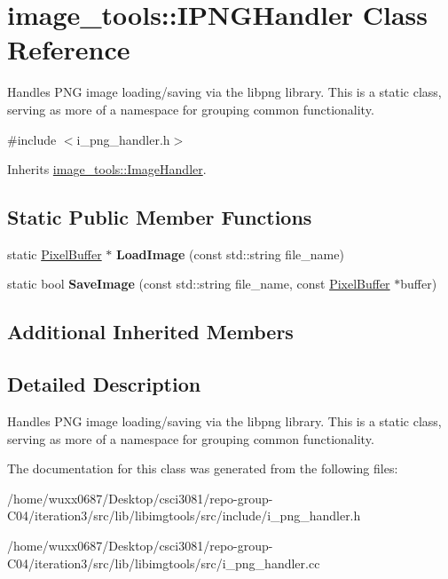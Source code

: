 \hypertarget{classimage__tools_1_1IPNGHandler}{}\section{image\+\_\+tools\+:\+:I\+P\+N\+G\+Handler Class Reference}
\label{classimage__tools_1_1IPNGHandler}


Handles P\+NG image loading/saving via the libpng library. This is a static class, serving as more of a namespace for grouping common functionality.  




{\ttfamily \#include $<$i\+\_\+png\+\_\+handler.\+h$>$}



Inherits \hyperlink{classimage__tools_1_1ImageHandler}{image\+\_\+tools\+::\+Image\+Handler}.

\subsection*{Static Public Member Functions}
\begin{DoxyCompactItemize}
\item 
static \hyperlink{classimage__tools_1_1PixelBuffer}{Pixel\+Buffer} $\ast$ {\bfseries Load\+Image} (const std\+::string file\+\_\+name)\hypertarget{classimage__tools_1_1IPNGHandler_a9ba654404b6584117fd03a260826c29b}{}\label{classimage__tools_1_1IPNGHandler_a9ba654404b6584117fd03a260826c29b}

\item 
static bool {\bfseries Save\+Image} (const std\+::string file\+\_\+name, const \hyperlink{classimage__tools_1_1PixelBuffer}{Pixel\+Buffer} $\ast$buffer)\hypertarget{classimage__tools_1_1IPNGHandler_ad69a60ad7d6f971d2b39c9cbb1e338c7}{}\label{classimage__tools_1_1IPNGHandler_ad69a60ad7d6f971d2b39c9cbb1e338c7}

\end{DoxyCompactItemize}
\subsection*{Additional Inherited Members}


\subsection{Detailed Description}
Handles P\+NG image loading/saving via the libpng library. This is a static class, serving as more of a namespace for grouping common functionality. 

The documentation for this class was generated from the following files\+:\begin{DoxyCompactItemize}
\item 
/home/wuxx0687/\+Desktop/csci3081/repo-\/group-\/\+C04/iteration3/src/lib/libimgtools/src/include/i\+\_\+png\+\_\+handler.\+h\item 
/home/wuxx0687/\+Desktop/csci3081/repo-\/group-\/\+C04/iteration3/src/lib/libimgtools/src/i\+\_\+png\+\_\+handler.\+cc\end{DoxyCompactItemize}
